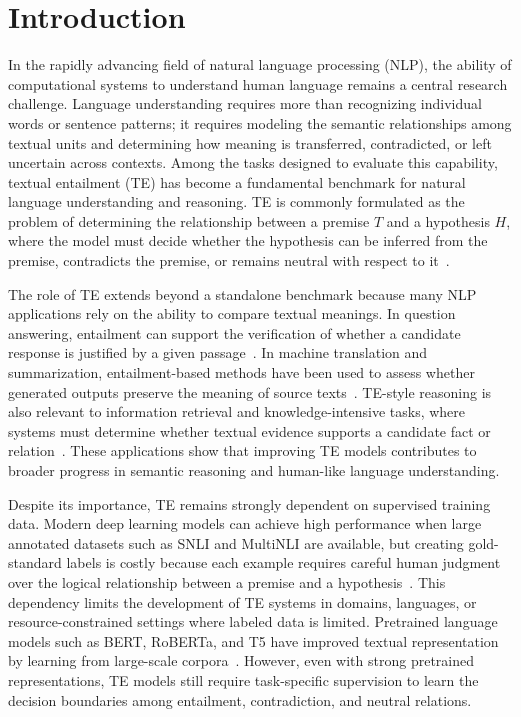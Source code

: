 \section{Introduction}

In the rapidly advancing field of natural language processing (NLP), the ability of computational systems to understand human language remains a central research challenge. Language understanding requires more than recognizing individual words or sentence patterns; it requires modeling the semantic relationships among textual units and determining how meaning is transferred, contradicted, or left uncertain across contexts. Among the tasks designed to evaluate this capability, textual entailment (TE) has become a fundamental benchmark for natural language understanding and reasoning. TE is commonly formulated as the problem of determining the relationship between a premise $T$ and a hypothesis $H$, where the model must decide whether the hypothesis can be inferred from the premise, contradicts the premise, or remains neutral with respect to it~\cite{dagan2006pascal,bowman2015large,williams2018broad}.

The role of TE extends beyond a standalone benchmark because many NLP applications rely on the ability to compare textual meanings. In question answering, entailment can support the verification of whether a candidate response is justified by a given passage~\cite{harabagiu2006methods,androutsopoulos2010survey}. In machine translation and summarization, entailment-based methods have been used to assess whether generated outputs preserve the meaning of source texts~\cite{pado2009textual,mehdad2013using}. TE-style reasoning is also relevant to information retrieval and knowledge-intensive tasks, where systems must determine whether textual evidence supports a candidate fact or relation~\cite{dagan2006pascal,bowman2015large}. These applications show that improving TE models contributes to broader progress in semantic reasoning and human-like language understanding.

Despite its importance, TE remains strongly dependent on supervised training data. Modern deep learning models can achieve high performance when large annotated datasets such as SNLI and MultiNLI are available, but creating gold-standard labels is costly because each example requires careful human judgment over the logical relationship between a premise and a hypothesis~\cite{bowman2015large,williams2018broad}. This dependency limits the development of TE systems in domains, languages, or resource-constrained settings where labeled data is limited. Pretrained language models such as BERT, RoBERTa, and T5 have improved textual representation by learning from large-scale corpora~\cite{devlin2019bert,liu2019roberta,raffel2020exploring}. However, even with strong pretrained representations, TE models still require task-specific supervision to learn the decision boundaries among entailment, contradiction, and neutral relations.

